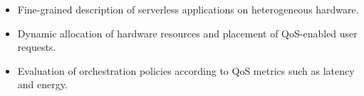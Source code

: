 

\begin{itemize}
    \item Fine-grained description of serverless applications on heterogeneous hardware.%
    \item Dynamic allocation of hardware resources and placement of QoS-enabled user requests.%
    \item Evaluation of orchestration policies according to QoS metrics such as latency and energy. %
\end{itemize}





